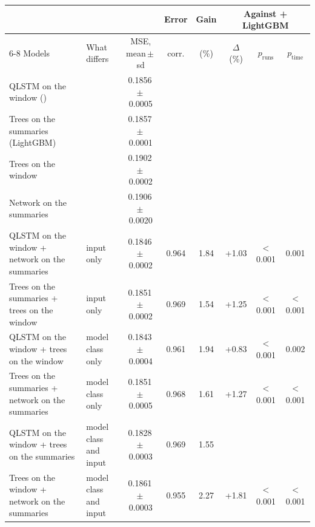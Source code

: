 \begin{tabular}{@{}llcccccc@{}}
\toprule
 & & & Error & Gain & \multicolumn{3}{c}{Against \HQ{} + LightGBM} \\
\cmidrule(l){6-8}
Models & What differs & MSE, mean\,$\pm$\,sd & corr. & (\%) & $\Delta$ (\%) & $p_{\mathrm{runs}}$ & $p_{\mathrm{time}}$ \\
\midrule
QLSTM on the window (\HQ{}) &  & 0.1856\,$\pm$\,0.0005 &  &  &  &  &  \\
Trees on the summaries (LightGBM) &  & 0.1857\,$\pm$\,0.0001 &  &  &  &  &  \\
Trees on the window &  & 0.1902\,$\pm$\,0.0002 &  &  &  &  &  \\
Network on the summaries &  & 0.1906\,$\pm$\,0.0020 &  &  &  &  &  \\
\addlinespace[2pt]
QLSTM on the window + network on the summaries & input only & 0.1846\,$\pm$\,0.0002 & 0.964 & 1.84 & +1.03 & $<$0.001 & 0.001 \\
Trees on the summaries + trees on the window & input only & 0.1851\,$\pm$\,0.0002 & 0.969 & 1.54 & +1.25 & $<$0.001 & $<$0.001 \\
QLSTM on the window + trees on the window & model class only & 0.1843\,$\pm$\,0.0004 & 0.961 & 1.94 & +0.83 & $<$0.001 & 0.002 \\
Trees on the summaries + network on the summaries & model class only & 0.1851\,$\pm$\,0.0005 & 0.968 & 1.61 & +1.27 & $<$0.001 & $<$0.001 \\
QLSTM on the window + trees on the summaries & model class and input & 0.1828\,$\pm$\,0.0003 & 0.969 & 1.55 &  &  &  \\
Trees on the window + network on the summaries & model class and input & 0.1861\,$\pm$\,0.0003 & 0.955 & 2.27 & +1.81 & $<$0.001 & $<$0.001 \\
\bottomrule
\end{tabular}
